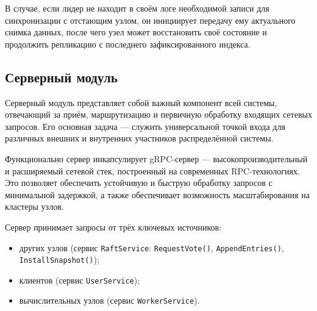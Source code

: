 В случае, если лидер не находит в своём логе необходимой записи для
синхронизации с отстающим узлом, он инициирует передачу ему актуального
снимка данных, после чего узел может восстановить своё состояние и продолжить
репликацию с последнего зафиксированного индекса.

\subsection{Серверный модуль}

Серверный модуль представляет собой важный компонент всей системы,
отвечающий за приём, маршрутизацию и первичную обработку входящих сетевых
запросов. Его основная задача — служить универсальной точкой входа для
различных внешних и внутренних участников распределённой системы.

Функционально сервер инкапсулирует gRPC-сервер — высокопроизводительный и
расширяемый сетевой стек, построенный на современных RPC-технологиях. Это
позволяет обеспечить устойчивую и быструю обработку запросов с минимальной
задержкой, а также обеспечивает возможность масштабирования на кластеры узлов.

Сервер принимает запросы от трёх ключевых источников:
\begin{itemize}
    \item других узлов (сервис \texttt{RaftService}: \texttt{RequestVote()},
    \texttt{AppendEntries()}, \texttt{InstallSnapshot()});
    \item клиентов (сервис \texttt{UserService});
    \item вычислительных узлов (сервис \texttt{WorkerService}).
\end{itemize}

